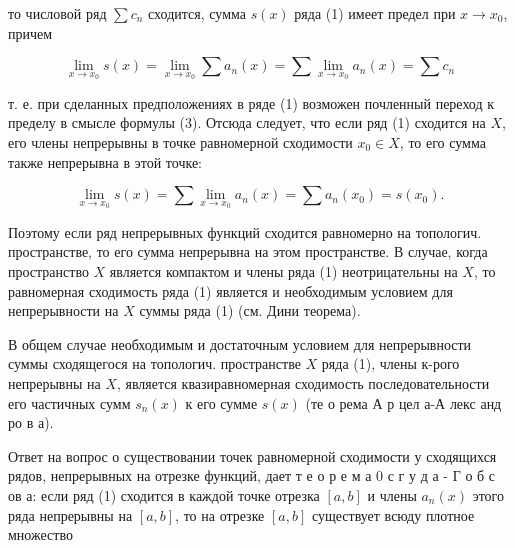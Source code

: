 \documentclass[10pt]{article}
\begin{document}
то числовой ряд $\sum c_{n}$ сходится, сумма $s(x)$ ряда (1) имеет предел при $x \rightarrow x_{0}$, причем



\[

\lim _{x \rightarrow x_{0}} s(x)=\lim _{x \rightarrow x_{0}} \sum a_{n}(x)=\sum \lim _{x \rightarrow x_{0}} a_{n}(x)=\sum c_{n}

\]



т. е. при сделанных предположениях в ряде (1) возможен почленный переход к пределу в смысле формулы (3). Отсюда следует, что если ряд (1) сходится на $X$, его члены непрерывны в точке равномерной сходимости $x_{0} \in X$, то его сумма также непрерывна в этой точке:



\[

\lim _{x \rightarrow x_{0}} s(x)=\sum \lim _{x \rightarrow x_{0}} a_{n}(x)=\sum a_{n}\left(x_{0}\right)=s\left(x_{0}\right) .

\]



Поэтому если ряд непрерывных функций сходится равномерно на топологич. пространстве, то его сумма непрерывна на этом пространстве. В случае, когда пространство $X$ является компактом и члены ряда (1) неотрицательны на $X$, то равномерная сходимость ряда (1) является и необходимым условием для непрерывности на $X$ суммы ряда (1) (см. Дини теорема).



В общем случае необходимым и достаточным условием для непрерывности суммы сходящегося на топологич. пространстве $X$ ряда (1), члены к-рого непрерывны на $X$, является квазиравномерная сходимость последовательности его частичных сумм $s_{n}(x)$ к его сумме $s(x)$ (те о рема А р цел а-А лекс анд ро в а).



Ответ на вопрос о существовании точек равномерной сходимости у сходящихся рядов, непрерывных на отрезке функций, дает т е о р е м а 0 с г у д а - Г о б с ов а: если ряд (1) сходится в каждой точке отрезка $[a, b]$ и члены $a_{n}(x)$ этого ряда непрерывны на $[a, b]$, то на отрезке $[a, b]$ существует всюду плотное множество
\end{document}

